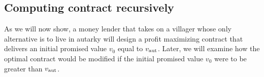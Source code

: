 
\subsection{Computing contract recursively}\label{recursive_comp_cont}%
As we will now show, a money lender that takes on a villager whose only alternative is to live in autarky will design a profit maximizing contract that delivers an initial promised value $v_0$ equal to $v_{\rm aut}$. Later, we will examine how the optimal contract would be modified if the initial promised value $v_0$ were to be greater than $v_{\rm aut}$.

